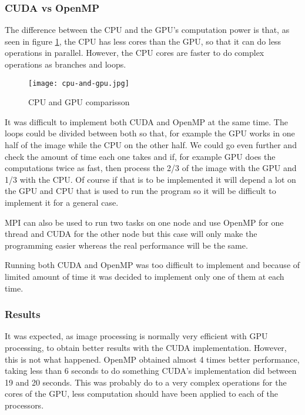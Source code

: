 \documentclass[conference,compsoc]{IEEEtran}
\begin{document}
\subsubsection{CUDA vs OpenMP}

The difference between the CPU and the GPU's computation power is that, as seen in figure \ref{fig:cpu-gpu}, the CPU has less cores than the GPU, so that it can do less operations in parallel. However, the CPU cores are faster to do complex operations as branches and loops.

\begin{figure}[H]
	\texttt{[image: cpu-and-gpu.jpg]}	\centering
	\caption{CPU and GPU comparisson	\label{fig:cpu-gpu}}
\end{figure}

It was difficult to implement both CUDA and OpenMP at the same time. The loops could be divided between both so that, for example the GPU works in one half of the image while the CPU on the other half. We could go even further and check the amount of time each one takes and if, for example GPU does the computations twice as fast, then process the 2/3 of the image with the GPU and 1/3 with the CPU. Of course if that is to be implemented it will depend a lot on the GPU and CPU that is used to run the program so it will be difficult to implement it for a general case.

MPI can also be used to run two tasks on one node and use OpenMP for one thread and CUDA for the other node but this case will only make the programming easier whereas the real performance will be the same.

Running both CUDA and OpenMP was too difficult to implement and because of limited amount of time it was decided to implement only one of them at each time.

\subsubsection{Results}

It was expected, as image processing is normally very efficient with GPU processing, to obtain better results with the CUDA implementation. However, this is not what happened. OpenMP obtained almost 4 times better performance, taking less than 6 seconds to do something CUDA's implementation did between 19 and 20 seconds. 
This was probably do to a very complex operations for the cores of the GPU, less computation should have been applied to each of the processors.
\end{document}
